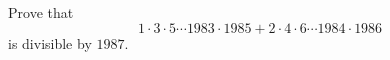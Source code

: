 Prove that
\[1\cdot3\cdot5\cdots1983\cdot1985+2\cdot4\cdot6\cdots1984\cdot1986\]
is divisible by $1987$.
